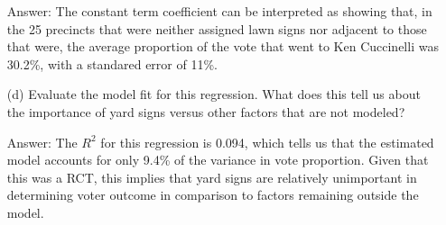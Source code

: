 \documentclass[12pt,letterpaper]{article}
\begin{document}
\begin{enumerate}
	\item [Answer:]
	The constant term coefficient can be interpreted as showing that, in the 25 precincts that were neither assigned lawn signs nor adjacent to those that were, the average proportion of the vote that went to Ken Cuccinelli was 30.2\%, with a standared error of 11\%.
	\vspace{1cm}
	
	\item [(d)] Evaluate the model fit for this regression.  What does this	tell us about the importance of yard signs versus other factors that are not modeled?
	\vspace{.25cm}
	
	\item [Answer:]
	The $R^2$ for this regression is 0.094, which tells us that the estimated model accounts for only 9.4\% of the variance in vote proportion. Given that this was a RCT, this implies that yard signs are relatively unimportant in determining voter outcome in comparison to factors remaining outside the model.
	
\end{enumerate}  
\end{document}
